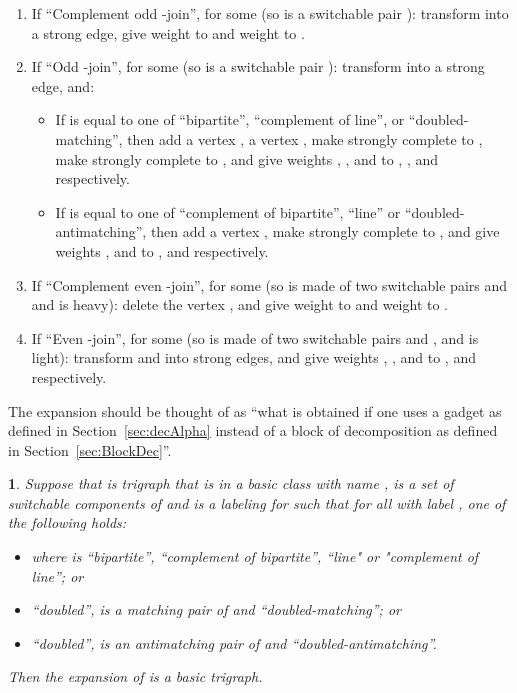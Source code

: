 \documentclass[11 pt] {article}
\newtheorem{theorem}{}[section]
\begin{document}
\begin{enumerate}
\item If ``Complement odd -join'',  for some  (so  is a switchable pair ):
  transform  into a strong edge, give weight  to 
   and weight  to .



\item If  ``Odd -join'',  for some  (so  is a switchable pair
  ): transform  into a strong edge, and:
  \begin{itemize}  
  \item If  is equal to one of ``bipartite'', ``complement of
    line'', or ``doubled-matching'', then add a vertex , a vertex
    , make  strongly complete to , make
     strongly complete to , and give weights
    , ,  and  to , ,  and
     respectively.
  \item If  is equal to one of ``complement of bipartite'',
    ``line'' or ``doubled-antimatching'', then add a vertex , make
     strongly complete to , and
    give weights ,  and  to ,  and 
    respectively.
  \end{itemize}

\item If ``Complement even -join'',  for some  (so  is made of two switchable pairs
   and  and  is heavy): delete the vertex , and give weight 
   to  and   weight  to .

\item If  ``Even -join'',  for some  (so  is made of two
  switchable pairs  and , and  is light): transform  
  and  into strong edges, and give weights , , and  to ,  and  respectively.

\end{enumerate}

The expansion should be thought of as ``what is obtained if one uses a
gadget as defined in Section~\ref{sec:decAlpha} instead of a
block of decomposition as defined in Section~\ref{sec:BlockDec}''.  

\begin{theorem}
  \label{expBas}
  Suppose that  is trigraph that is in a basic class  with name ,
   is a set of switchable components of  and  is a
  labeling for  such that for all  with label ,
  one of the following holds:
  \begin{itemize}
  \item  where  is ``bipartite'', ``complement of
    bipartite'', ``line" or "complement of line''; or
  \item  ``doubled'',  is a matching pair of  and  ``doubled-matching''; or 
 \item  ``doubled'',  is an antimatching pair of  and  ``doubled-antimatching''. 
 \end{itemize}

 Then the expansion of  is a basic trigraph.
\end{theorem}
\end{document}
